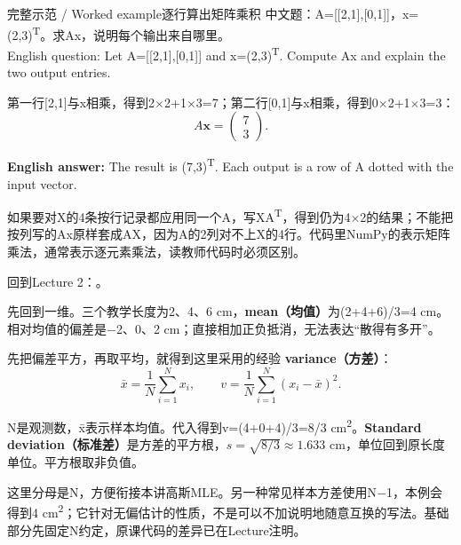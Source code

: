 \begin{StudyBlock}{完整示范 / Worked example}{逐行算出矩阵乘积}
中文题：A=[[2,1],[0,1]]，x=(2,3)\textsuperscript{T}。求Ax，说明每个输出来自哪里。\\

English question: Let A=[[2,1],[0,1]] and x=(2,3)\textsuperscript{T}. Compute Ax and explain the two output entries.


第一行[2,1]与x相乘，得到2\ensuremath{\times}2+1\ensuremath{\times}3=7；第二行[0,1]与x相乘，得到0\ensuremath{\times}2+1\ensuremath{\times}3=3：
\[
A\mathbf{x}=\begin{pmatrix}7\\3\end{pmatrix}.\tag{M.26}
\]


\textbf{English answer:} The result is (7,3)\textsuperscript{T}. Each output is a row of A dotted with the input vector.
\end{StudyBlock}


如果要对X的4条按行记录都应用同一个A，写XA\textsuperscript{T}，得到仍为4\ensuremath{\times}2的结果；不能把按列写的Ax原样套成AX，因为A的2列对不上X的4行。代码里NumPy的表示矩阵乘法，\StudyInline{*}通常表示逐元素乘法，读教师代码时必须区别。


回到Lecture 2：。








先回到一维。三个教学长度为2、4、6 cm，\textbf{mean（均值）}为(2+4+6)/3=4 cm。相对均值的偏差是\ensuremath{-}2、0、2 cm；直接相加正负抵消，无法表达“散得有多开”。


先把偏差平方，再取平均，就得到这里采用的经验 \textbf{variance（方差）}：
\[
\bar x=\frac1N\sum_{i=1}^N x_i,\qquad
v=\frac1N\sum_{i=1}^N(x_i-\bar x)^2.\tag{M.27}
\]


N是观测数，x̄表示样本均值。代入得到v=(4+0+4)/3=8/3 cm\textsuperscript{2}。\textbf{Standard deviation（标准差）}是方差的平方根，\(s=\sqrt{8/3}\approx1.633\) cm，单位回到原长度单位。平方根取非负值。


这里分母是N，方便衔接本讲高斯MLE。另一种常见样本方差使用N\ensuremath{-}1，本例会得到4 cm\textsuperscript{2}；它针对无偏估计的性质，不是可以不加说明地随意互换的写法。基础部分先固定N约定，原课代码的差异已在Lecture注明。


